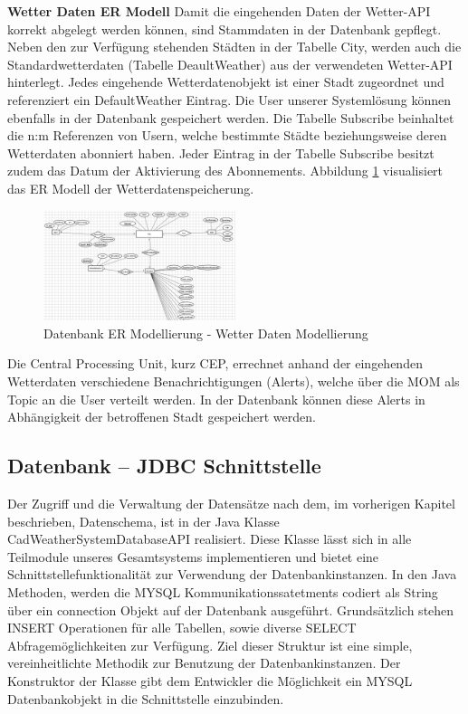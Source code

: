 \textbf{Wetter Daten ER Modell}
Damit die eingehenden Daten der Wetter-API  korrekt abgelegt werden können, sind Stammdaten in der Datenbank gepflegt. Neben den zur Verfügung stehenden Städten in der Tabelle City, werden auch die Standardwetterdaten (Tabelle DeaultWeather) aus der verwendeten Wetter-API hinterlegt. Jedes eingehende  Wetterdatenobjekt ist einer Stadt zugeordnet und referenziert ein DefaultWeather Eintrag.
Die User unserer Systemlösung können ebenfalls in der Datenbank gespeichert werden. Die Tabelle Subscribe beinhaltet die n:m Referenzen von Usern, welche bestimmte Städte beziehungsweise deren Wetterdaten abonniert haben. Jeder Eintrag in der Tabelle Subscribe besitzt zudem das Datum der Aktivierung des Abonnements. Abbildung \ref{img:DBSchemaWetterDaten} visualisiert das ER Modell der Wetterdatenspeicherung.
\begin{figure}[htbp]
	\centering
	\includegraphics[width=0.5\textwidth]{Bilder/DBWetterDaten.png}
	\caption{Datenbank ER Modellierung - Wetter Daten Modellierung}
	\label{img:DBSchemaWetterDaten}
\end{figure} 
Die Central Processing Unit, kurz CEP, errechnet anhand der eingehenden Wetterdaten verschiedene Benachrichtigungen (Alerts), welche über die MOM als Topic an die User verteilt werden. In der Datenbank können diese Alerts in Abhängigkeit der betroffenen Stadt gespeichert werden.

\subsection{Datenbank – JDBC Schnittstelle}
Der Zugriff und die Verwaltung der Datensätze nach dem, im vorherigen Kapitel beschrieben, Datenschema, ist in der Java Klasse CadWeatherSystemDatabaseAPI realisiert. Diese Klasse lässt sich in alle Teilmodule unseres Gesamtsystems implementieren und bietet eine Schnittstellefunktionalität zur Verwendung der Datenbankinstanzen. In den Java Methoden, werden die MYSQL Kommunikationssatetments codiert als String über ein connection Objekt auf der Datenbank ausgeführt. Grundsätzlich stehen INSERT Operationen für alle Tabellen, sowie diverse SELECT Abfragemöglichkeiten zur Verfügung. Ziel dieser Struktur ist eine simple, vereinheitlichte Methodik zur Benutzung der Datenbankinstanzen.
Der Konstruktor der Klasse gibt dem Entwickler die Möglichkeit ein MYSQL Datenbankobjekt in die Schnittstelle einzubinden.

